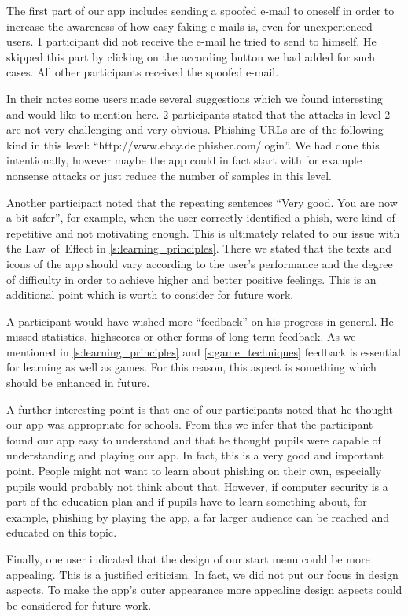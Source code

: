 \begin{description}[leftmargin=0cm]
	\item[Mail Not Received] The first part of our app includes sending a spoofed e-mail to oneself in order to increase the awareness of how easy faking e-mails is, even for unexperienced users.
1 participant did not receive the e-mail he tried to send to himself.
He skipped this part by clicking on the according button we had added for such cases.
All other participants received the spoofed e-mail.
	\item[Further Suggestions] In their notes some users made several suggestions which we found interesting and would like to mention here.
2 participants stated that the attacks in level 2 are not very challenging and very obvious.
Phishing URLs are of the following kind in this level: ``http://www.ebay.de.phisher.com/login''.
We had done this intentionally, however maybe the app could in fact start with for example nonsense attacks or just reduce the number of samples in this level.

Another participant noted that the repeating sentences ``Very good. You are now a bit safer'', for example, when the user correctly identified a phish, were kind of repetitive and not motivating enough. This is ultimately related to our issue with the Law~of~Effect in \autoref{s:learning_principles}.
There we stated that the texts and icons of the app should vary according to the user's performance and the degree of difficulty in order to achieve higher and better positive feelings.
This is an additional point which is worth to consider for future work.

A participant would have wished more ``feedback'' on his progress in general. 
He missed statistics, highscores or other forms of long-term feedback.
As we mentioned in \autoref{s:learning_principles} and \autoref{s:game_techniques} feedback is essential for learning as well as games.
For this reason, this aspect is something which should be enhanced in future.

A further interesting point is that one of our participants noted that he thought our app was appropriate for schools.
From this we infer that the participant found our app easy to understand and that he thought pupils were capable of understanding and playing our app.
In fact, this is a very good and important point.
People might not want to learn about phishing on their own, especially pupils would probably not think about that.
However, if computer security is a part of the education plan and if pupils have to learn something about, for example, phishing by playing the app, a far larger audience can be reached and educated on this topic.	

Finally, one user indicated that the design of our start menu could be more appealing.
This is a justified criticism.
In fact, we did not put our focus in design aspects.
To make the app's outer appearance more appealing design aspects could be considered for future work.
\end{description}

